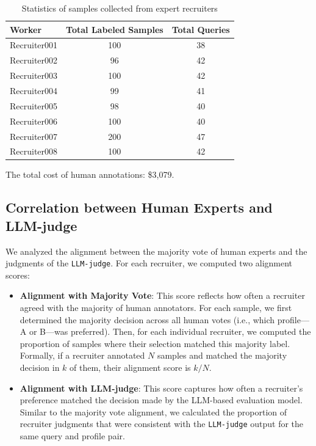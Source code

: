 \documentclass{article}
\begin{document}
\begin{table}[ht]
\centering
\begin{tabular}{lcc}
\hline
\textbf{Worker} & \textbf{Total Labeled Samples} & \textbf{Total Queries} \\
\hline
Recruiter001 & 100 & 38 \\
Recruiter002 & 96  & 42 \\
Recruiter003 & 100 & 42 \\
Recruiter004 & 99  & 41 \\
Recruiter005 & 98  & 40 \\
Recruiter006 & 100 & 40 \\
Recruiter007 & 200 & 47 \\
Recruiter008 & 100 & 42 \\
\hline
\end{tabular}
\caption{Statistics of samples collected from expert recruiters}
\label{tab:sample_stats}
\end{table}


The total cost of human annotations: \$3,079.


\subsection{Correlation between Human Experts and LLM-judge}

We analyzed the alignment between the majority vote of human experts and the judgments of the \texttt{LLM-judge}. For each recruiter, we computed two alignment scores:

\begin{itemize}
    \item \textbf{Alignment with Majority Vote}: This score reflects how often a recruiter agreed with the majority of human annotators. For each sample, we first determined the majority decision across all human votes (i.e., which profile—A or B—was preferred). Then, for each individual recruiter, we computed the proportion of samples where their selection matched this majority label. Formally, if a recruiter annotated $N$ samples and matched the majority decision in $k$ of them, their alignment score is $k/N$.
    
    \item \textbf{Alignment with LLM-judge}: This score captures how often a recruiter's preference matched the decision made by the LLM-based evaluation model. Similar to the majority vote alignment, we calculated the proportion of recruiter judgments that were consistent with the \texttt{LLM-judge} output for the same query and profile pair.
\end{itemize}
\end{document}
